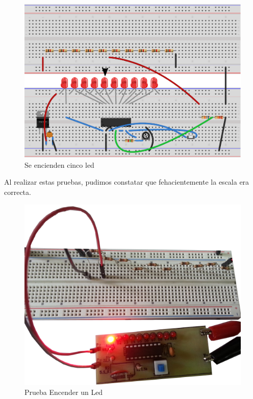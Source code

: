 \documentclass[12pt,a4paper]{article}
\begin{document}
			\begin{figure}[H]
			\centering
				\includegraphics[scale=0.9]{images/labo1_bb.pdf}\caption{Se encienden cinco led}
			\end{figure}

			Al realizar estas pruebas, pudimos constatar que fehacientemente la escala era correcta.

			\begin{figure}[H]
			\centering
				\includegraphics[scale=0.6]{images/res1.png}\caption{Prueba Encender un Led}
			\end{figure}
\end{document}
